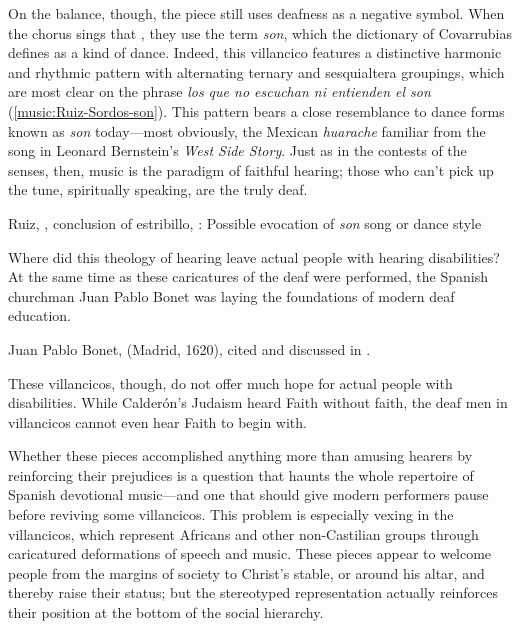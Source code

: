 On the balance, though, the piece still uses deafness as a negative symbol.
When the chorus sings that , they use the term \emph{son}, which the dictionary of
Covarrubias defines as a kind of dance.
Indeed, this villancico features a distinctive harmonic and rhythmic pattern
with alternating ternary and sesquialtera groupings, which are most clear on the
phrase \emph{los que no escuchan ni entienden el son}
(\cref{music:Ruiz-Sordos-son}).
This pattern bears a close resemblance to dance forms known as \emph{son}
today---most obviously, the Mexican \emph{huarache} familiar from the song
 in Leonard Bernstein's \emph{West Side Story}.%
    \Autocites
    []{Grove}
    {Wells:WestSideStory}
Just as in the contests of the senses, then, music is the paradigm of faithful
hearing; those who can't pick up the tune, spiritually speaking, are the truly
deaf.

\begin{musicexample}
    \caption{Ruiz, , conclusion of estribillo,
    : Possible evocation of \emph{son} song or dance style}

    \label{music:Ruiz-Sordos-son}

\end{musicexample}

Where did this theology of hearing leave actual people with hearing
disabilities? 
At the same time as these caricatures of the deaf were performed, the Spanish
churchman Juan Pablo Bonet was laying the foundations of modern deaf education.%
\begin{Footnote}
    Juan Pablo Bonet,  (Madrid, 1620), cited and discussed in
    \autocite{Plann:DeafEducationSpain}.  
\end{Footnote}
These villancicos, though, do not offer much hope for actual people with
disabilities.
While Calderón's Judaism heard Faith without faith, the deaf men in villancicos
cannot even hear Faith to begin with.

Whether these pieces accomplished anything more than amusing hearers by
reinforcing their prejudices is a question that haunts the whole repertoire of
Spanish devotional music---and one that should give modern performers pause
before reviving some villancicos.%
    \Autocite[7]{Cashner:WLSCM32}
This problem is especially vexing in the  villancicos, which
represent Africans and other non-Castilian groups through caricatured
deformations of speech and music.%
    \Autocites{Baker:EthnicVC}{Baker:PerformancePostColonial}
These pieces appear to welcome people from the margins of society to Christ's
stable, or around his altar, and thereby raise their status; but the stereotyped
representation actually reinforces their position at the bottom of the social
hierarchy.

